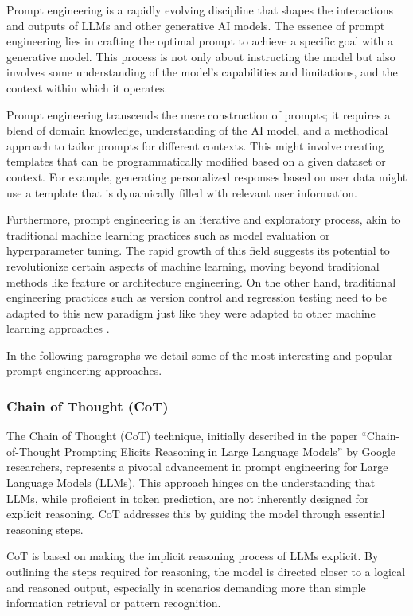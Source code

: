 \documentclass[conference]{IEEEtran}
\begin{document}
Prompt engineering is a rapidly evolving discipline that shapes the interactions and outputs of LLMs and other generative AI models. The essence of prompt engineering lies in crafting the optimal prompt to achieve a specific goal with a generative model. This process is not only about instructing the model but also involves some understanding of the model's capabilities and limitations, and the context within which it operates. 

Prompt engineering transcends the mere construction of prompts; it requires a blend of domain knowledge, understanding of the AI model, and a methodical approach to tailor prompts for different contexts. This might involve creating templates that can be programmatically modified based on a given dataset or context. For example, generating personalized responses based on user data might use a template that is dynamically filled with relevant user information. 

Furthermore, prompt engineering is an iterative and exploratory process, akin to traditional machine learning practices such as model evaluation or hyperparameter tuning. The rapid growth of this field suggests its potential to revolutionize certain aspects of machine learning, moving beyond traditional methods like feature or architecture engineering. On the other hand, traditional engineering practices such as version control and regression testing need to be adapted to this new paradigm just like they were adapted to other machine learning approaches \cite{Sculley2014CreditCard}.

In the following paragraphs we detail some of the most interesting and popular prompt engineering approaches.


\subsubsection{Chain of Thought (CoT)}

The Chain of Thought (CoT) technique, initially described in the paper ``Chain-of-Thought Prompting Elicits Reasoning in Large Language Models''\cite{Wei2022COT} by Google researchers, represents a pivotal advancement in prompt engineering for Large Language Models (LLMs). This approach hinges on the understanding that LLMs, while proficient in token prediction, are not inherently designed for explicit reasoning. CoT addresses this by guiding the model through essential reasoning steps.

CoT is based on making the implicit reasoning process of LLMs explicit. By outlining the steps required for reasoning, the model is directed closer to a logical and reasoned output, especially in scenarios demanding more than simple information retrieval or pattern recognition.
\end{document}
